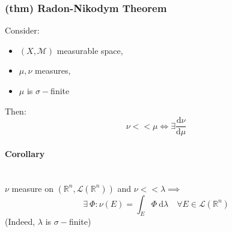 \subsubsection{(thm) Radon-Nikodym Theorem}
Consider:
\begin{itemize}
    \item $(X,\mathcal M)$ measurable space,
    \item $\mu, \nu$ measures,
    \item $\mu$ is $\sigma -$finite
\end{itemize}
Then:
$$\nu<<\mu\iff \exists\frac{\mathrm d \nu}{\mathrm d\mu}$$
\paragraph{Corollary} \ \\
$\nu$ measure on $(\mathbb R^n,\mathcal L(\mathbb R^n))$ and $\nu<<\lambda\implies$
$$\exists\ \Phi : \nu(E)=\int_E \Phi\ \mathrm d\lambda \quad \forall E\in \mathcal L(\mathbb R^n)$$
(Indeed, $\lambda $ is $\sigma-$finite)
